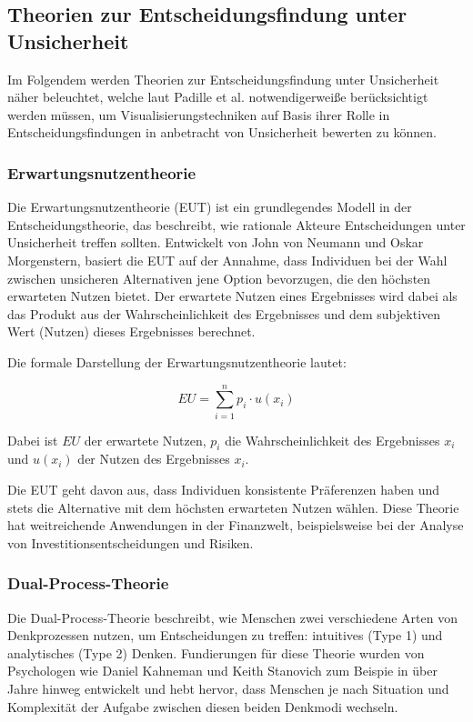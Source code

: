 \subsection{Theorien zur Entscheidungsfindung unter Unsicherheit}
Im Folgendem werden Theorien zur Entscheidungsfindung unter Unsicherheit näher beleuchtet, welche laut Padille et al. notwendigerweiße berücksichtigt
werden müssen, um Visualisierungstechniken auf Basis ihrer Rolle in Entscheidungsfindungen in anbetracht von Unsicherheit bewerten zu können. \cite{VisualizationPsychology2023}

\subsubsection{Erwartungsnutzentheorie}

Die Erwartungsnutzentheorie (\ac{EUT}) ist ein grundlegendes Modell in der Entscheidungstheorie, das beschreibt, wie rationale Akteure Entscheidungen unter Unsicherheit 
treffen sollten. Entwickelt von John von Neumann und Oskar Morgenstern, basiert die EUT auf der Annahme, dass Individuen bei der 
Wahl zwischen unsicheren Alternativen jene Option bevorzugen, die den höchsten erwarteten Nutzen bietet. Der erwartete Nutzen eines 
Ergebnisses wird dabei als das Produkt aus der Wahrscheinlichkeit des Ergebnisses und dem subjektiven Wert (Nutzen) dieses Ergebnisses 
berechnet.

Die formale Darstellung der Erwartungsnutzentheorie lautet:

\begin{equation}
EU = \sum_{i=1}^{n} p_i \cdot u(x_i)
\end{equation}

Dabei ist \( EU \) der erwartete Nutzen, \( p_i \) die Wahrscheinlichkeit des Ergebnisses \( x_i \) und \( u(x_i) \) der Nutzen des 
Ergebnisses \( x_i \).

Die EUT geht davon aus, dass Individuen konsistente Präferenzen haben und stets die Alternative mit dem höchsten erwarteten Nutzen 
wählen. \cite{vonNeumann1944} Diese Theorie hat weitreichende Anwendungen in der Finanzwelt, beispielsweise bei der Analyse von 
Investitionsentscheidungen und Risiken. 

\subsubsection{Dual-Process-Theorie}

Die Dual-Process-Theorie beschreibt, wie Menschen zwei verschiedene Arten von Denkprozessen nutzen, um Entscheidungen zu treffen: 
intuitives (Type 1) und analytisches (Type 2) Denken. Fundierungen für diese Theorie wurden von Psychologen wie Daniel Kahneman und Keith 
Stanovich zum Beispie in \cite{Tversky74} über Jahre hinweg entwickelt und hebt hervor, dass Menschen je nach Situation und 
Komplexität der Aufgabe zwischen diesen beiden Denkmodi wechseln.

